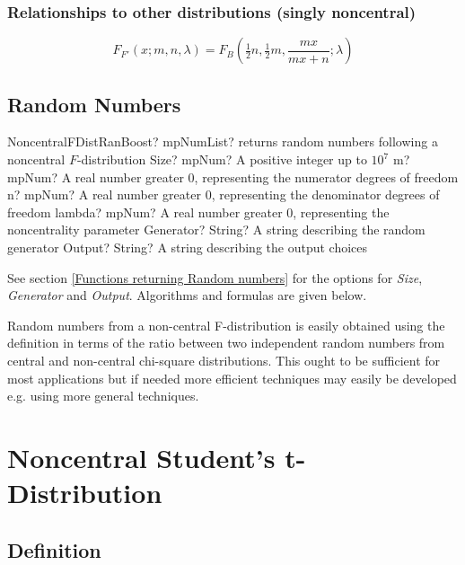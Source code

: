\subsubsection{Relationships to other distributions (singly noncentral)}
\begin{equation}
	F_{F'}(x;m,n,\lambda) = F_B\left(\tfrac{1}{2} n, \tfrac{1}{2} m,\frac{mx}{mx+n};\lambda\right)
\end{equation}

\subsection{Random Numbers}
\label{NonCentralFDistributionRandom}


\begin{mpFunctionsExtract}
	\mpFunctionSix
	{NoncentralFDistRanBoost? mpNumList? returns random numbers following a noncentral $F$-distribution}
	{Size? mpNum? A positive integer up to $10^7$}
	{m? mpNum? A real number greater 0, representing the numerator  degrees of freedom}
	{n? mpNum? A real number greater 0, representing the denominator degrees of freedom}
	{lambda? mpNum? A real number greater 0, representing the noncentrality parameter}
	{Generator? String? A string describing the random generator}
	{Output? String? A string describing the output choices}
\end{mpFunctionsExtract}

\vspace{0.3cm}
See section \ref{Functions returning Random numbers} for the options for  {\itshape\sffamily Size},  {\itshape\sffamily Generator} and {\itshape\sffamily Output}. Algorithms and formulas are given below.

Random numbers from a non-central F-distribution is easily obtained using the definition in terms of the ratio between two independent random numbers from central and non-central chi-square distributions. This ought to be sufficient for most applications but if needed more efficient techniques may easily be developed e.g. using more general techniques.





\section{Noncentral Student's t-Distribution}
\label{NoncentraltDistributionBoost}


\subsection{Definition}
\label{NoncentraltDistributionDefinitionBoost}


